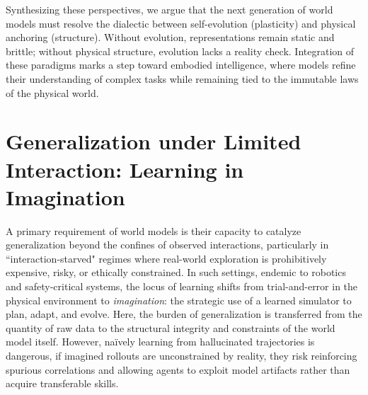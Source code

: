\documentclass[pdflatex,sn-mathphys-num]{sn-jnl}
\theoremstyle{thmstyleone}%
\theoremstyle{thmstyletwo}%
\theoremstyle{thmstylethree}%
\begin{document}
Synthesizing these perspectives, we argue that the next generation of world models must resolve the dialectic between self-evolution (plasticity) and physical anchoring (structure). Without evolution, representations remain static and brittle; without physical structure, evolution lacks a reality check. Integration of these paradigms marks a step toward embodied intelligence, where models refine their understanding of complex tasks while remaining tied to the immutable laws of the physical world.

\section{Generalization under Limited Interaction: Learning in Imagination}

A primary requirement of world models is their capacity to catalyze generalization \citep{liu2021towards, chen2024neural, kachaev2025don} beyond the confines of observed interactions, particularly in ``interaction-starved" regimes where real-world exploration is prohibitively expensive, risky, or ethically constrained. In such settings, endemic to robotics and safety-critical systems, the locus of learning shifts from trial-and-error in the physical environment to \emph{imagination}: the strategic use of a learned simulator to plan, adapt, and evolve. Here, the burden of generalization is transferred from the quantity of raw data to the structural integrity and constraints of the world model itself. However, naïvely learning from hallucinated trajectories is dangerous, if imagined rollouts are unconstrained by reality, they risk reinforcing spurious correlations and allowing agents to exploit model artifacts rather than acquire transferable skills.

\end{document}
